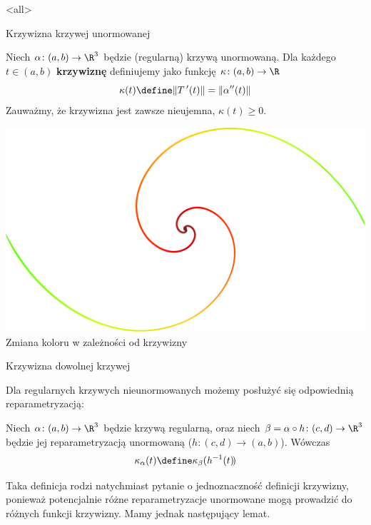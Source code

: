 \mode<all>{}
\begin{frame}{Krzywizna krzywej unormowanej}
\begin{definicja}
Niech $\alpha\colon(a,b)\to \R^3$ będzie (regularną) krzywą unormowaną. Dla każdego $t\in (a,b)$ \textbf{krzywiznę} definiujemy jako funkcję $\kappa\colon (a,b)\to\R$
\[\kappa(t)\define\|T\,'(t)\|=\|\alpha''(t)\|\]
Zauważmy, że krzywizna jest zawsze nieujemna, $\kappa(t)\geqslant 0$.
\end{definicja}
\end{frame}
\begin{frame}
\begin{center}
\includegraphics[scale=.5]{./pictures/curvature_color.pdf}\\

Zmiana koloru w zależności od krzywizny
\end{center}
\end{frame}
\begin{frame}{Krzywizna dowolnej krzywej}

Dla regularnych krzywych nieunormowanych możemy posłużyć się odpowiednią reparametryzacją:
\pause \begin{definicja}
Niech $\alpha\colon (a,b)\to \R^3$ będzie krzywą regularną, oraz niech $\beta=\alpha\circ h \colon (c,d)\to \R^3$ będzie jej reparametryzacją unormowaną ($h\colon (c,d)\to (a,b)$). Wówczas \[\kappa_\alpha(t)\define\kappa_\beta(h^{-1} (t)\!)\]
\end{definicja}

\pause{}

\end{frame}
Taka definicja rodzi natychmiast pytanie o jednoznaczność definicji krzywizny, ponieważ potencjalnie różne reparametryzacje unormowane mogą prowadzić do różnych funkcji krzywizny. Mamy jednak następujący lemat.

